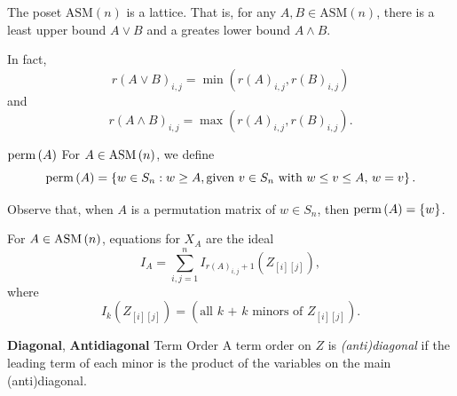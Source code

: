 \documentclass[co439]{subfiles}
\begin{document}
    \begin{theorem}{}
        The poset $\text{ASM}\left( n \right)$ is a lattice. That is, for any $A,B\in\text{ASM}\left( n \right)$, there is a least upper bound $A\vee B$ and a greates lower bound $A\wedge B$.

        In fact,
        \begin{equation*}
            r\left( A\vee B \right)_{i,j} = \min\left( r\left( A \right)_{i,j}, r\left( B \right)_{i,j} \right)
        \end{equation*}
        and
        \begin{equation*}
            r\left( A\wedge B \right)_{i,j} = \max\left( r\left( A \right)_{i,j}, r\left( B \right)_{i,j} \right).
        \end{equation*}
    \end{theorem}

    \rruleline

    \begin{notation}{$\operatorname{perm}\left( A \right)$}
        For $A\in\operatorname{ASM}\left( n \right)$, we define
        \begin{equation*}
            \operatorname{perm}\left( A \right) = \left\lbrace w\in S_n: w\geq A , \text{given $v\in S_n$ with $w\leq v\leq A$, $w=v$} \right\rbrace.
        \end{equation*}
    \end{notation}

    \np Observe that, when $A$ is a permutation matrix of $w\in S_n$, then $\operatorname{perm}\left( A \right) = \left\lbrace w \right\rbrace$.

    \np For $A\in\operatorname{ASM}\left( n \right)$, equations for $X_A$ are the ideal
    \begin{equation*}
        I_A = \sum^{n}_{i,j=1} I_{r\left( A \right)_{i,j}+1} \left( Z_{\left[ i \right]\left[ j \right]} \right),
    \end{equation*}
    where
    \begin{equation*}
        I_k\left( Z_{\left[ i \right]\left[ j \right]} \right) = \left( \text{all $k$ + $k$ minors of $Z_{\left[ i \right]\left[ j \right]}$} \right).
    \end{equation*}

    \begin{definition}{\textbf{Diagonal}, \textbf{Antidiagonal} Term Order}
        A term order on $Z$ is \emph{(anti)diagonal} if the leading term of each minor is the product of the variables on the main (anti)diagonal.
    \end{definition}
\end{document}

